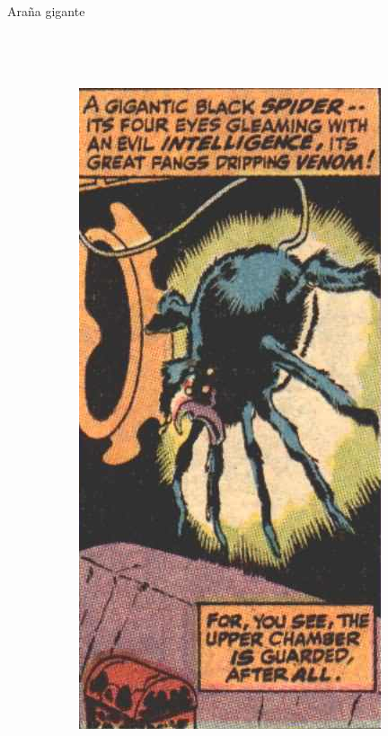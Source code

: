 \begin{frame}{Araña gigante}
\begin{columns}
\begin{figure}[htp]
\begin{subfigure}[b]{0.3\textwidth}
 \end{subfigure}
~
 \begin{subfigure}[b]{0.2\textwidth}
   \includegraphics[width=\textwidth]{img/arana/CTB}
 \end{subfigure}
\end{figure}
\end{columns}
\end{frame}
\note{

}

